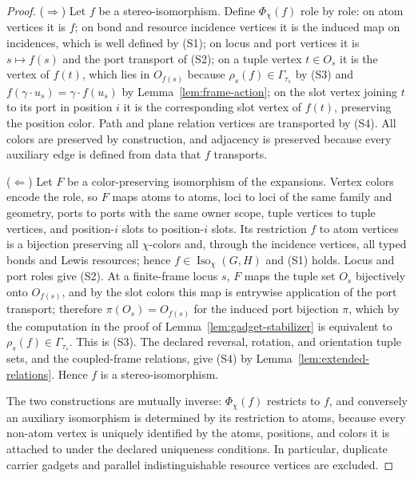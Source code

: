 \documentclass[pdflatex,sn-mathphys-num,referee,lineno]{sn-jnl}
\theoremstyle{plain}
\theoremstyle{remark}
\theoremstyle{definition}
\begin{document}
\begin{proof}
(\(\Rightarrow\)) Let \(f\) be a stereo-isomorphism.  Define \(\Phi_\chi(f)\)
role by role: on atom vertices it is \(f\); on bond and resource incidence
vertices it is the induced map on incidences, which is well defined by (S1); on
locus and port vertices it is \(s\mapsto f(s)\) and the port transport of (S2);
on a tuple vertex \(t\in O_s\) it is the vertex of \(f(t)\), which lies in
\(O_{f(s)}\) because \(\rho_s(f)\in\Gamma_{\tau_s}\) by (S3) and
\(f(\gamma\cdot u_s)=\gamma\cdot f(u_s)\) by
Lemma~\ref{lem:frame-action}; on the slot vertex joining \(t\) to its port in
position \(i\) it is the corresponding slot vertex of \(f(t)\), preserving the
position color.  Path and plane relation vertices are transported by (S4).  All
colors are preserved by construction, and adjacency is preserved because every
auxiliary edge is defined from data that \(f\) transports.

(\(\Leftarrow\)) Let \(F\) be a color-preserving isomorphism of the expansions.
Vertex colors encode the role, so \(F\) maps atoms to atoms, loci to loci of
the same family and geometry, ports to ports with the same owner scope, tuple
vertices to tuple vertices, and position-\(i\) slots to position-\(i\) slots.
Its restriction \(f\) to atom vertices is a bijection preserving all
\(\chi\)-colors and, through the incidence vertices, all typed bonds and Lewis
resources; hence \(f\in\operatorname{Iso}_\chi(G,H)\) and (S1) holds.  Locus and
port roles give (S2).  At a finite-frame locus \(s\), \(F\) maps the tuple set
\(O_s\) bijectively onto \(O_{f(s)}\), and by the slot colors this map is
entrywise application of the port transport; therefore
\(\pi(O_s)=O_{f(s)}\) for the induced port bijection \(\pi\), which by the
computation in the proof of Lemma~\ref{lem:gadget-stabilizer} is equivalent to
\(\rho_s(f)\in\Gamma_{\tau_s}\).  This is (S3).  The declared reversal,
rotation, and orientation tuple sets, and the coupled-frame relations,
give (S4) by Lemma~\ref{lem:extended-relations}. Hence \(f\) is a stereo-isomorphism.

The two constructions are mutually inverse: \(\Phi_\chi(f)\) restricts to
\(f\), and conversely an auxiliary isomorphism is determined by its restriction
to atoms, because every non-atom vertex is uniquely identified by the atoms,
positions, and colors it is attached to under the declared uniqueness
conditions. In particular, duplicate carrier gadgets and parallel
indistinguishable resource vertices are excluded.
\end{proof}
\end{document}
